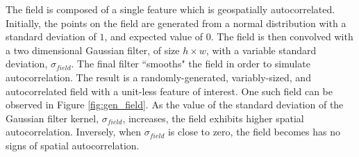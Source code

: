 The field is composed of a single feature which is geospatially autocorrelated. Initially, the points on the field are generated from a normal distribution with a standard deviation of $1$, and expected value of $0$. The field is then convolved with a two dimensional Gaussian filter, of size $h \times w$, with a variable standard deviation, $\sigma_{field}$. The final filter ``smooths" the field in order to simulate autocorrelation. The result is a randomly-generated, variably-sized, and autocorrelated field with a unit-less feature of interest. One such field can be observed in Figure \ref{fig:gen_field}. As the value of the standard deviation of the Gaussian filter kernel, $\sigma_{field}$, increases, the field exhibits higher spatial autocorrelation. Inversely, when $\sigma_{field}$ is close to zero, the field becomes has no signs of spatial autocorrelation.


